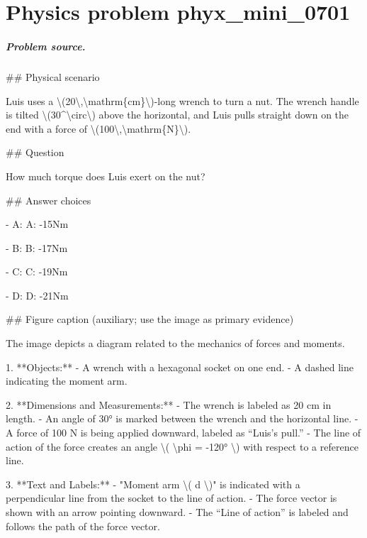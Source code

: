 
\chapter{Physics problem phyx\_mini\_0701}
\label{ch:PhyXMiniProblems_problem_phyx_mini_0701}

\paragraph{Problem source.}
\#\# Physical scenario

Luis uses a \textbackslash{}(20\textbackslash{},\textbackslash{}mathrm\{cm\}\textbackslash{})-long wrench to turn a nut. The wrench handle is tilted \textbackslash{}(30\textasciicircum{}\textbackslash{}circ\textbackslash{}) above the horizontal, and Luis pulls straight down on the end with a force of \textbackslash{}(100\textbackslash{},\textbackslash{}mathrm\{N\}\textbackslash{}).

\#\# Question

How much torque does Luis exert on the nut?

\#\# Answer choices

- A: A: -15Nm

- B: B: -17Nm

- C: C: -19Nm

- D: D: -21Nm

\#\# Figure caption (auxiliary; use the image as primary evidence)

The image depicts a diagram related to the mechanics of forces and moments. 

1. **Objects:**
   - A wrench with a hexagonal socket on one end.
   - A dashed line indicating the moment arm.

2. **Dimensions and Measurements:**
   - The wrench is labeled as 20 cm in length.
   - An angle of 30° is marked between the wrench and the horizontal line.
   - A force of 100 N is being applied downward, labeled as “Luis’s pull.”
   - The line of action of the force creates an angle \textbackslash{}( \textbackslash{}phi = -120° \textbackslash{}) with respect to a reference line.

3. **Text and Labels:**
   - "Moment arm \textbackslash{}( d \textbackslash{})" is indicated with a perpendicular line from the socket to the line of action.
   - The force vector is shown with an arrow pointing downward.
   - The “Line of action” is labeled and follows the path of the force vector.

